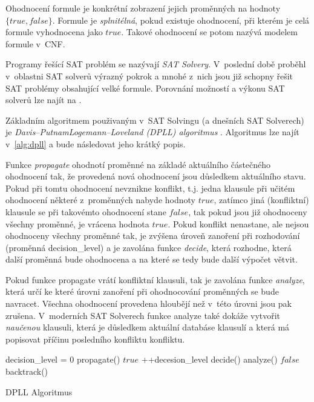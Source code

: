 \documentclass[a4paper, 12pt]{article}
\begin{document}
Ohodnocení formule je konkrétní zobrazení jejich proměnných na hodnoty $\{true, false\}$.
Formule je \emph{splnitélná}, pokud existuje ohodnocení, při kterém je celá formule vyhodnocena
jako $true$.
Takové ohodnocení se potom nazývá modelem formule v~CNF.

Programy řešící SAT problém se nazývají \emph{SAT Solvery}.
V~poslední době proběhl v~oblastni SAT solverů výrazný pokrok a mnohé z~nich jsou již
schopny  řešit SAT problémy obsahující velké formule.
Porovnání možností a výkonu SAT solverů lze najít na \cite{www:sat}.

Základním algoritmem použivaným v~SAT Solvingu (a dnešních SAT Solverech) je
\emph{Davis–Putnam\-Logemann–Loveland (DPLL) algoritmus} \cite{dpll:1960, dpll:1962}.
Algoritmus lze najít v~\ref{alg:dpll} a bude následovat jeho krátký popis.

Funkce \emph{propagate} ohodnotí proměnné na základé aktuálního částečného ohodnocení tak, že
provedená nová ohodnocení jsou důsledkem aktuálního stavu.
Pokud při tomtu ohodnocení nevznikne konflikt, t.j. jedna klausule při učitém ohodnocení některé z~proměnných nabyde hodnoty $true$,
zatímco jiná (konfliktní) klausule se při takovémto ohodnocení stane $false$, tak pokud jsou již ohodnoceny všechny proměnné, je vrácena
hodnota $true$.
Pokud konflikt nenastane, ale nejsou ohodnoceny všechny proměnné tak, je zvýšena úroveň zanoření při rozhodování (proměnná decision\_level)
a je zavolána funkce \emph{decide}, která rozhodne, která další proměnná bude ohodnocena a na které se tedy bude další výpočet větvit.

Pokud funkce propagate vrátí konfliktní klausuli, tak je zavolána funkce \emph{analyze}, která určí ke které úrovni zanoření při ohodnocování
proměnných se bude navracet.
Všechna ohodnocení provedena hloubějí než v~této úrovni jsou pak zrušena.
V~moderních SAT Solverech funkce analyze také dokáže vytvořit \emph{naučenou} klausuli, která je důsledkem aktuální databáse klausulí a která
má popisovat příčinu posledního konfliktu konfliktu.

\begin{algorithm}
\label{alg:dpll}
    decision\_level = 0\;
    {
        propagate()\;
        {
            {
                \Return $true$\;
            }
            {
                ++decesion\_level\;
                decide()\;
            }
        }
        {
            analyze()\;
            {
                \Return $false$\;
            }
            {
                backtrack()\;
            }
        }
    }
\caption{DPLL Algoritmus}
\end{algorithm}
\end{document}
